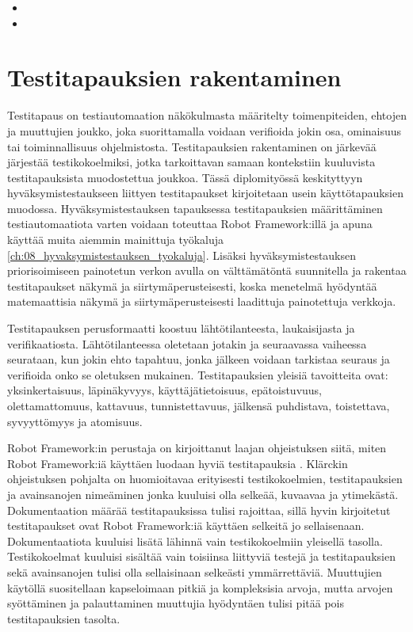   \begin{itemize}
    \item <TODO: Kappale per käytetty työkalu>
    \item <TODO: Kappale käyttöönotosta, CI, ATDD>
  \end{itemize}

\section{Testitapauksien rakentaminen} \label{ch:08_testitapauksien_rakentaminen}

  Testitapaus on testiautomaation näkökulmasta määritelty toimenpiteiden, ehtojen ja muuttujien joukko, joka suorittamalla voidaan verifioida jokin osa, ominaisuus tai toiminnallisuus ohjelmistosta.
  Testitapauksien rakentaminen on järkevää järjestää testikokoelmiksi, jotka tarkoittavan samaan kontekstiin kuuluvista testitapauksista muodostettua joukkoa.
  Tässä diplomityössä keskityttyyn hyväksymistestaukseen liittyen testitapaukset kirjoitetaan usein käyttötapauksien muodossa.
  Hyväksymistestauksen tapauksessa testitapauksien määrittäminen testiautomaatiota varten voidaan toteuttaa Robot Framework:illä ja apuna käyttää muita aiemmin mainittuja työkaluja \ref{ch:08_hyvaksymistestauksen_tyokaluja}.
  Lisäksi hyväksymistestauksen priorisoimiseen painotetun verkon avulla on välttämätöntä suunnitella ja rakentaa testitapaukset näkymä ja siirtymäperusteisesti, koska menetelmä hyödyntää matemaattisia näkymä ja siirtymäperusteisesti laadittuja painotettuja verkkoja.

  Testitapauksen perusformaatti koostuu lähtötilanteesta, laukaisijasta ja verifikaatiosta.
  Lähtötilanteessa oletetaan jotakin ja seuraavassa vaiheessa seurataan, kun jokin ehto tapahtuu, jonka jälkeen voidaan tarkistaa seuraus ja verifioida onko se oletuksen mukainen.
  Testitapauksien yleisiä tavoitteita ovat: yksinkertaisuus, läpinäkyvyys, käyttäjätietoisuus, epätoistuvuus, olettamattomuus, kattavuus, tunnistettavuus, jälkensä puhdistava, toistettava, syvyyttömyys ja atomisuus. %

  Robot Framework:in perustaja on kirjoittanut laajan ohjeistuksen siitä, miten Robot Framework:iä käyttäen luodaan hyviä testitapauksia \parencite{klarck_how-to-write-good-test-cases_2019}.
  Klärckin ohjeistuksen pohjalta on huomioitavaa erityisesti testikokoelmien, testitapauksien ja avainsanojen nimeäminen jonka kuuluisi olla selkeää, kuvaavaa ja ytimekästä.
  Dokumentaation määrää testitapauksissa tulisi rajoittaa, sillä hyvin kirjoitetut testitapaukset ovat Robot Framework:iä käyttäen selkeitä jo sellaisenaan.
  Dokumentaatiota kuuluisi lisätä lähinnä vain testikokoelmiin yleisellä tasolla.
  Testikokoelmat kuuluisi sisältää vain toisiinsa liittyviä testejä ja testitapauksien sekä avainsanojen tulisi olla sellaisinaan selkeästi ymmärrettäviä.
  Muuttujien käytöllä suositellaan kapseloimaan pitkiä ja kompleksisia arvoja, mutta arvojen syöttäminen ja palauttaminen muuttujia hyödyntäen tulisi pitää pois testitapauksien tasolta.

